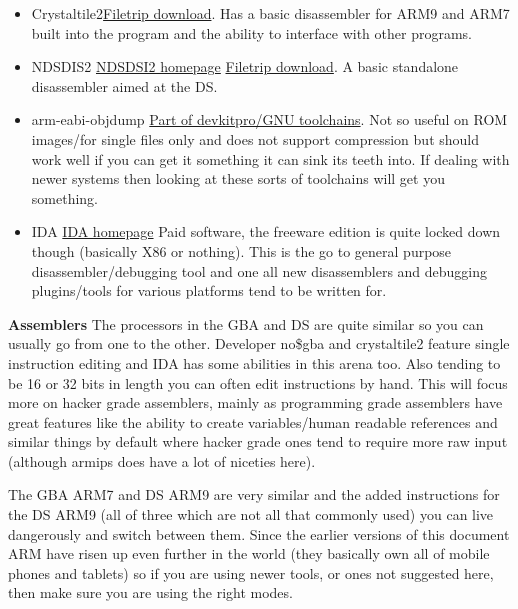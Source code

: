 \documentclass[
]{book}
\providecommand{\tightlist}{%
  \setlength{\itemsep}{0pt}\setlength{\parskip}{0pt}}
\begin{document}
\begin{itemize}
\tightlist
\item
  Crystaltile2\href{http://filetrip.net/f23649-CrystalTile2-2010-09-06.html}{Filetrip download}. Has a basic disassembler for ARM9 and ARM7 built into the program and the ability to interface with other programs.
\item
  NDSDIS2 \href{http://hp.vector.co.jp/authors/VA018359/nds/ndshack.html}{NDSDSI2 homepage} \href{http://filetrip.net/nds-downloads/utilities/download-ndsdis2-223-f28977.html}{Filetrip download}. A basic standalone disassembler aimed at the DS.
\item
  arm-eabi-objdump \href{http://devkitpro.org/}{Part of devkitpro/GNU toolchains}. Not so useful on ROM images/for single files only and does not support compression but should work well if you can get it something it can sink its teeth into. If dealing with newer systems then looking at these sorts of toolchains will get you something.
\item
  IDA \href{http://www.hex-rays.com/products/ida/overview.shtml}{IDA homepage} Paid software, the freeware edition is quite locked down though (basically X86 or nothing). This is the go to general purpose disassembler/debugging tool and one all new disassemblers and debugging plugins/tools for various platforms tend to be written for.
\end{itemize}

\textbf{Assemblers} The processors in the GBA and DS are quite similar so you can usually go from one to the other. Developer no\$gba and crystaltile2 feature single instruction editing and IDA has some abilities in this arena too. Also tending to be 16 or 32 bits in length you can often edit instructions by hand. This will focus more on hacker grade assemblers, mainly as programming grade assemblers have great features like the ability to create variables/human readable references and similar things by default where hacker grade ones tend to require more raw input (although armips does have a lot of niceties here).

The GBA ARM7 and DS ARM9 are very similar and the added instructions for the DS ARM9 (all of three which are not all that commonly used) you can live dangerously and switch between them. Since the earlier versions of this document ARM have risen up even further in the world (they basically own all of mobile phones and tablets) so if you are using newer tools, or ones not suggested here, then make sure you are using the right modes.
\end{document}
